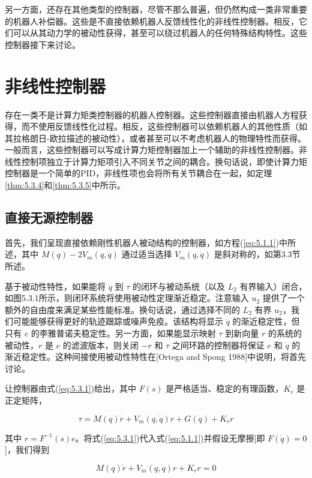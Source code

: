 \documentclass[UTF8,12pt,a4paper]{ctexart}
\begin{document}
另一方面，还存在其他类型的控制器，尽管不那么普遍，但仍然构成一类非常重要的机器人补偿器。这些是不直接依赖机器人反馈线性化的非线性控制器。相反，它们可以从其动力学的被动性获得，甚至可以绕过机器人的任何特殊结构特性。这些控制器接下来讨论。

\section{非线性控制器}

存在一类不是计算力矩类控制器的机器人控制器。这些控制器直接由机器人方程获得，而不使用反馈线性化过程。相反，这些控制器可以依赖机器人的其他性质（如其拉格朗日-欧拉描述的被动性），或者甚至可以不考虑机器人的物理特性而获得。一般而言，这些控制器可以写成计算力矩控制器加上一个辅助的非线性控制器。非线性控制项独立于计算力矩项引入不同关节之间的耦合。换句话说，即使计算力矩控制器是一个简单的PID，非线性项也会将所有关节耦合在一起，如定理\ref{thm:5.3.4}和\ref{thm:5.3.5}中所示。

\subsection{直接无源控制器}

首先，我们呈现直接依赖刚性机器人被动结构的控制器，如方程(\ref{eq:5.1.1})中所述，其中 $\dot{M}(q) - 2V_m(q, \dot{q})$ 通过适当选择 $V_m(q, \dot{q})$ 是斜对称的，如第3.3节所述。

基于被动性特性，如果能将 $\dot{q}$ 到 $\tau$ 的闭环与被动系统（以及 $L_2$ 有界输入）闭合，如图5.3.1所示，则闭环系统将使用被动性定理渐近稳定。注意输入 $u_2$ 提供了一个额外的自由度来满足某些性能标准。换句话说，通过选择不同的 $L_2$ 有界 $u_2$，我们可能能够获得更好的轨迹跟踪或噪声免疫。该结构将显示 $\dot{q}$ 的渐近稳定性，但只有 $e$ 的李雅普诺夫稳定性。另一方面，如果能显示映射 $\tau$ 到新向量 $r$ 的系统的被动性，$r$ 是 $e$ 的滤波版本，则关闭 $-r$ 和 $\tau$ 之间环路的控制器将保证 $e$ 和 $\dot{q}$ 的渐近稳定性。这种间接使用被动性特性在[Ortega and Spong 1988]中说明，将首先讨论。

让控制器由式(\ref{eq:5.3.1})给出，其中 $F(s)$ 是严格适当、稳定的有理函数，$K_r$ 是正定矩阵，

\begin{equation}\label{eq:5.3.1}
\tau = M(q)\dot{r} + V_m(q, \dot{q})r + G(q) + K_r r
\end{equation}

其中 $r = F^{-1}(s)e$。将式(\ref{eq:5.3.1})代入式(\ref{eq:5.1.1})并假设无摩擦[即 $F(\dot{q}) = 0$]，我们得到

\begin{equation}\label{eq:5.3.2}
M(q)\dot{r} + V_m(q, \dot{q})r + K_r r = 0
\end{equation}
\end{document}
